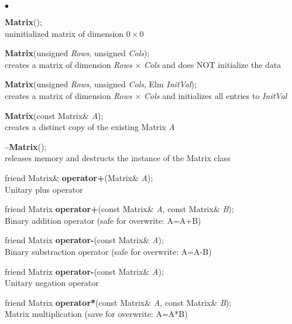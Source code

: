 \documentclass{article}
\newcommand{\Func}[1]{\textbf{#1}}
\newcommand{\var}[1]{\textit{#1}}
\newcommand{\tild}{\ensuremath{\overset{\sim}{~}}}
\newenvironment{LIST}{\begin{list}{$\bullet$}{%
      \setlength{\leftmargin}{2\leftmargin}%
      \setlength{\itemindent}{-1cm}}}%
  {\end{list}}
\begin{document}
\begin{LIST}
 \item \Func{Matrix}();\\
  uninitialized matrix of dimension $0 \times 0$
 \item \Func{Matrix}(unsigned \var{Rows}, unsigned \var{Cols});\\
  creates a matrix of dimension \var{Rows} $\times$ \var{Cols} and does NOT
  initialize the data
 \item \Func{Matrix}(unsigned \var{Rows}, unsigned \var{Cols}, Elm
  \var{InitVal});\\
  creates a matrix of dimension \var{Rows} $\times$ \var{Cols} and initializes
  all entries to \var{InitVal}
 \item \Func{Matrix}(const Matrix\& \var{A});\\
  creates a distinct copy of the existing Matrix \var{A}
 \item \Func{\tild Matrix}();\\
  releases memory and destructs the instance of the Matrix class\\[.5cm]

 \item friend Matrix\& \Func{operator+}(Matrix\& \var{A});\\
  Unitary plus operator
 \item friend Matrix \Func{operator+}(const Matrix\& \var{A}, const Matrix\&
  \var{B});\\
  Binary addition operator (safe for overwrite: A=A+B)
 \item friend Matrix \Func{operator-}(const Matrix\& \var{A});\\
  Binary substraction operator (safe for overwrite: A=A-B)
 \item friend Matrix \Func{operator-}(const Matrix\& \var{A});\\
  Unitary negation operator
 \item friend Matrix \Func{operator*}(const Matrix\& \var{A}, const Matrix\&
  \var{B});\\
  Matrix multiplication (save for overwrite: A=A*B)
  

\end{LIST}
\end{document}
